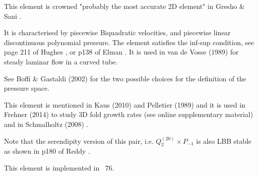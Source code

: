 
\noindent
\begin{minipage}{0.58\textwidth}


This element is crowned "probably the most accurate 2D element" 
in Gresho \& Sani \cite{grsa}.

It is characterised by piecewise Biquadratic velocities, 
and piecewise linear discontinuous polynomial pressure. 
The element satisfies the inf-sup condition, see page 211 of Hughes \cite{hugh}, or 
p138 of Elman \etal \cite{elsw}.
It is used in van de Vosse \etal (1989) \cite{vavs89} for steady laminar flow in a curved tube. 

See Boffi \& Gastaldi (2002) \cite{boga02} 
for the two possible choices for the definition of the pressure space.

This element is mentioned in Kaus (2010) \cite{kaus10} and Pelletier \etal (1989) \cite{pefc89} 
and it is  used in Frehner (2014) \cite{freh14} to study 3D fold growth rates 
(see online supplementary material) and in Schmalholtz (2008) \cite{schm08}.

Note that the serendipity version of this pair, i.e. $Q_2^{(20)}\times P_{-1}$ is also LBB stable
as shown in p180 of Reddy \cite{reddybook2}.

This element is implemented in \stone~76. 

\end{minipage}
\hfill
\begin{minipage}{0.38\textwidth}
\begin{center}

\end{center}
\end{minipage}


